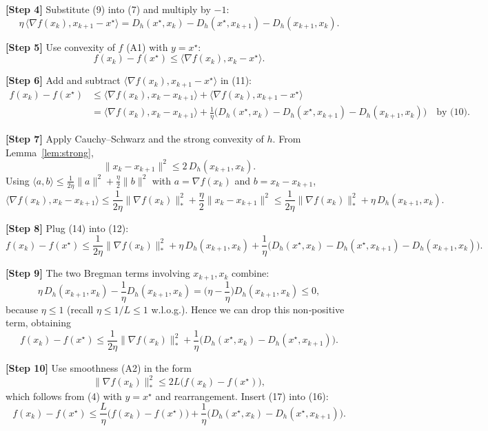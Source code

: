 \documentclass{article}
\newcommand{\Breg}[2]{D_{h}(#1,#2)}
\newcommand{\inner}[2]{\langle #1,#2\rangle}
\newcommand{\grad}{\nabla}
\begin{document}
\noindent\textbf{[Step 4]}  Substitute (9) into (7) and multiply by $-1$:
\[
\eta\,\inner{\grad f(x_k)}{x_{k+1}-x^{\star}}
= \Breg{x^{\star}}{x_k}-\Breg{x^{\star}}{x_{k+1}}
- \Breg{x_{k+1}}{x_k}.
\tag{10}
\]

\noindent\textbf{[Step 5]}  Use convexity of $f$ (A1) with $y=x^{\star}$:
\[
f(x_k)-f(x^{\star})\le \inner{\grad f(x_k)}{x_k-x^{\star}}.
\tag{11}
\]

\noindent\textbf{[Step 6]}  Add and subtract $\inner{\grad f(x_k)}{x_{k+1}-x^{\star}}$ in (11):
\[
\begin{aligned}
f(x_k)-f(x^{\star})
&\le \inner{\grad f(x_k)}{x_k-x_{k+1}}
   +\inner{\grad f(x_k)}{x_{k+1}-x^{\star}}\\
&= \inner{\grad f(x_k)}{x_k-x_{k+1}}
   +\frac{1}{\eta}\Big(\Breg{x^{\star}}{x_k}
          -\Breg{x^{\star}}{x_{k+1}}-\Breg{x_{k+1}}{x_k}\Big)
   \quad\text{by (10)}.
\end{aligned}
\tag{12}
\]

\noindent\textbf{[Step 7]}  Apply Cauchy–Schwarz and the strong convexity of $h$.
From Lemma~\ref{lem:strong},
\[
\|x_k-x_{k+1}\|^{2}\le 2\,\Breg{x_{k+1}}{x_k}.
\tag{13}
\]
Using $\inner{a}{b}\le\frac{1}{2\eta}\|a\|^{2}+\frac{\eta}{2}\|b\|^{2}$
with $a=\grad f(x_k)$ and $b=x_k-x_{k+1}$,
\[
\inner{\grad f(x_k)}{x_k-x_{k+1}}
\le \frac{1}{2\eta}\|\grad f(x_k)\|_{*}^{2}
   +\frac{\eta}{2}\|x_k-x_{k+1}\|^{2}
\le \frac{1}{2\eta}\|\grad f(x_k)\|_{*}^{2}
   +\eta\,\Breg{x_{k+1}}{x_k}.
\tag{14}
\]

\noindent\textbf{[Step 8]}  Plug (14) into (12):
\[
f(x_k)-f(x^{\star})
\le \frac{1}{2\eta}\|\grad f(x_k)\|_{*}^{2}
   +\eta\,\Breg{x_{k+1}}{x_k}
   +\frac{1}{\eta}\Big(\Breg{x^{\star}}{x_k}
          -\Breg{x^{\star}}{x_{k+1}}-\Breg{x_{k+1}}{x_k}\Big).
\tag{15}
\]

\noindent\textbf{[Step 9]}  The two Bregman terms involving $x_{k+1},x_k$
combine:
\[
\eta\,\Breg{x_{k+1}}{x_k}
-\frac{1}{\eta}\Breg{x_{k+1}}{x_k}
= \Big(\eta-\frac{1}{\eta}\Big)\Breg{x_{k+1}}{x_k}
\le 0,
\]
because $\eta\le 1$ (recall $\eta\le 1/L\le 1$ w.l.o.g.). Hence we can drop this
non‑positive term, obtaining
\[
f(x_k)-f(x^{\star})
\le \frac{1}{2\eta}\|\grad f(x_k)\|_{*}^{2}
   +\frac{1}{\eta}\Big(\Breg{x^{\star}}{x_k}
          -\Breg{x^{\star}}{x_{k+1}}\Big).
\tag{16}
\]

\noindent\textbf{[Step 10]}  Use smoothness (A2) in the form
\[
\|\grad f(x_k)\|_{*}^{2}\le 2L\big(f(x_k)-f(x^{\star})\big),
\tag{17}
\]
which follows from (4) with $y=x^{\star}$ and rearrangement.
Insert (17) into (16):
\[
f(x_k)-f(x^{\star})
\le \frac{L}{\eta}\big(f(x_k)-f(x^{\star})\big)
   +\frac{1}{\eta}\Big(\Breg{x^{\star}}{x_k}
          -\Breg{x^{\star}}{x_{k+1}}\Big).
\tag{18}
\]
\end{document}
